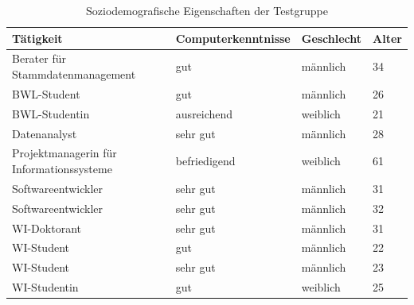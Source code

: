 \documentclass[
  language=german, %
  type=bachelor,%
  ngerman
]{isthesis}
\begin{document}
\begin{content}
  \begin{table}[]
    \footnotesize
    \begin{tabular}{l l l l}
      Tätigkeit & Computerkenntnisse & Geschlecht & Alter \\
      \toprule
      Berater für Stammdatenmanagement & gut & männlich & 34 \\
      \acrshort{BWL}-Student & gut & männlich & 26 \\
      \acrshort{BWL}-Studentin & ausreichend & weiblich & 21 \\
      Datenanalyst & sehr gut & männlich & 28 \\
      Projektmanagerin für Informationssysteme & befriedigend & weiblich & 61\\
      Softwareentwickler & sehr gut & männlich & 31 \\
      Softwareentwickler & sehr gut & männlich & 32 \\
      \acrshort{WI}-Doktorant & sehr gut & männlich & 31 \\
      \acrshort{WI}-Student & gut & männlich & 22 \\
      \acrshort{WI}-Student & sehr gut & männlich & 23 \\
      \acrshort{WI}-Studentin & gut & weiblich & 25 \\
    \end{tabular}
    \caption{Soziodemografische Eigenschaften der Testgruppe}\label{table:testgruppe}
  \end{table}


\end{content}
\end{document}
